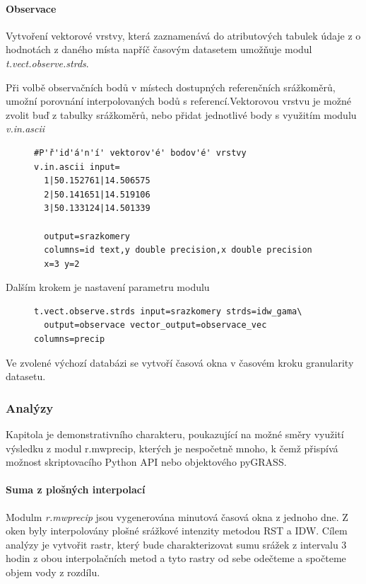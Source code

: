 \documentclass[a4paper,12pt,oneside]{report}
\begin{document}
\paragraph{Observace}
Vytvoření vektorové vrstvy, která zaznamenává do atributových tabulek údaje z o hodnotách z daného místa napříč časovým datasetem umožňuje modul \textit{t.vect.observe.strds}.

Při volbě observačních bodů v místech dostupných referenčních srážkoměrů, umožní porovnání interpolovaných bodů s referencí.Vektorovou vrstvu je možné zvolit buď z tabulky srážkoměrů, nebo přidat jednotlivé body s využitím modulu \textit{v.in.ascii}
\begin{figure}[h!]
\begin{footnotesize}
\lstset{extendedchars=false,
escapeinside=''}
\begin{lstlisting}[style=mybash]
#P'ř'id'á'n'í' vektorov'é' bodov'é' vrstvy
v.in.ascii input=
  1|50.152761|14.506575
  2|50.141651|14.519106
  3|50.133124|14.501339
  
  output=srazkomery 
  columns=id text,y double precision,x double precision 
  x=3 y=2
\end{lstlisting}
\end{footnotesize} 
\end{figure}

Dalším krokem je nastavení parametru modulu
\begin{figure}[h!]
\begin{footnotesize}
\lstset{extendedchars=false,
escapeinside=''}
\begin{lstlisting}[style=mybash]
t.vect.observe.strds input=srazkomery strds=idw_gama\
  output=observace vector_output=observace_vec columns=precip
\end{lstlisting}
\end{footnotesize} 
\end{figure}

Ve zvolené výchozí databázi se vytvoří časová okna v časovém kroku granularity datasetu.

\subsubsection*{Analýzy}
Kapitola je demonstrativního charakteru, poukazující na možné směry využití výsledku z modul r.mwprecip, kterých je nespočetně mnoho, k čemž přispívá možnost skriptovacího Python API nebo objektového pyGRASS. 

\paragraph*{Suma z plošných interpolací}
Modulm \emph{r.mwprecip} jsou vygenerována minutová časová okna z jednoho dne. Z oken byly interpolovány plošné srážkové intenzity metodou RST a IDW. Cílem analýzy je vytvořit rastr, který bude charakterizovat sumu srážek z intervalu 3 hodin z obou interpolačních metod a tyto rastry od sebe odečteme a spočteme objem vody z rozdílu.
\end{document}
